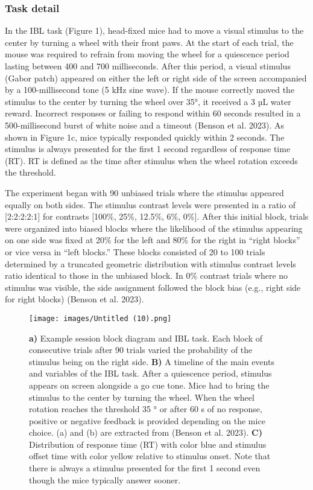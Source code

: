 \documentclass[
  letterpaper,
  DIV=11,
  numbers=noendperiod]{scrartcl}
\begin{document}
\subsubsection{Task detail}\label{task-detail}

In the IBL task (Figure 1), head-fixed mice had to move a visual
stimulus to the center by turning a wheel with their front paws. At the
start of each trial, the mouse was required to refrain from moving the
wheel for a quiescence period lasting between 400 and 700 milliseconds.
After this period, a visual stimulus (Gabor patch) appeared on either
the left or right side of the screen accompanied by a 100-millisecond
tone (5 kHz sine wave). If the mouse correctly moved the stimulus to the
center by turning the wheel over 35°, it received a 3 µL water reward.
Incorrect responses or failing to respond within 60 seconds resulted in
a 500-millisecond burst of white noise and a timeout (Benson et al.
2023). As shown in Figure 1c, mice typically responded quickly within 2
seconds. The stimulus is always presented for the first 1 second
regardless of response time (RT). RT is defined as the time after
stimulus when the wheel rotation exceeds the threshold.

The experiment began with 90 unbiased trials where the stimulus appeared
equally on both sides. The stimulus contrast levels were presented in a
ratio of {[}2:2:2:2:1{]} for contrasts {[}100\%, 25\%, 12.5\%, 6\%,
0\%{]}. After this initial block, trials were organized into biased
blocks where the likelihood of the stimulus appearing on one side was
fixed at 20\% for the left and 80\% for the right in ``right blocks'' or
vice versa in ``left blocks.'' These blocks consisted of 20 to 100
trials determined by a truncated geometric distribution with stimulus
contrast levels ratio identical to those in the unbiased block. In 0\%
contrast trials where no stimulus was visible, the side assignment
followed the block bias (e.g., right side for right blocks) (Benson et
al. 2023).

\begin{figure}[H]

{\centering \texttt{[image: images/Untitled (10).png]}

}

\caption{\textbf{a)} Example session block diagram and IBL task. Each
block of consecutive trials after 90 trials varied the probability of
the stimulus being on the right side. \textbf{B)} A timeline of the main
events and variables of the IBL task. After a quiescence period,
stimulus appears on screen alongside a go cue tone. Mice had to bring
the stimulus to the center by turning the wheel. When the wheel rotation
reaches the threshold 35 ° or after 60 s of no response, positive or
negative feedback is provided depending on the mice choice. (a) and (b)
are extracted from (Benson et al. 2023). \textbf{C)}~ Distribution of
response time (RT) with color blue and stimulus offset time with color
yellow relative to stimulus onset. Note that there is always a stimulus
presented for the first 1 second even though the mice typically answer
sooner.~}

\end{figure}%
\end{document}

